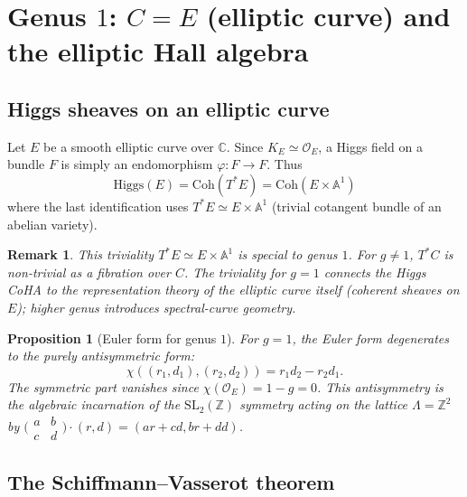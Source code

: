 \documentclass[11pt]{article}
\theoremstyle{garamondthm}
\newtheorem{proposition}[theorem]{Proposition}
\theoremstyle{garamonddef}
\theoremstyle{garamondrem}
\newtheorem{remark}[theorem]{Remark}
\newcommand{\Coh}{\mathrm{Coh}}
\newcommand{\cO}{\mathcal{O}}
\newcommand{\Higgs}{\mathrm{Higgs}}
\newcommand{\SL}{\mathrm{SL}}
\begin{document}

\section{Genus $1$: $C = E$ (elliptic curve) and the elliptic Hall algebra}
\label{sec:genus-1}

\subsection{Higgs sheaves on an elliptic curve}
\label{ssec:higgs-elliptic}

Let $E$ be a smooth elliptic curve over $\mathbb{C}$. Since $K_E \simeq \cO_E$, a Higgs field on a bundle $F$ is simply an endomorphism $\varphi \colon F \to F$. Thus
\[
 \Higgs(E) = \Coh(T^*E) = \Coh(E \times \mathbb{A}^1)
\]
where the last identification uses $T^*E \simeq E \times \mathbb{A}^1$ (trivial cotangent bundle of an abelian variety).

\begin{remark}
\label{rem:elliptic-trivial-cotangent}
This triviality $T^*E \simeq E \times \mathbb{A}^1$ is special to genus $1$. For $g \neq 1$, $T^*C$ is non-trivial as a fibration over $C$. The triviality for $g = 1$ connects the Higgs CoHA to the representation theory of the \emph{elliptic curve itself} (coherent sheaves on $E$); higher genus introduces spectral-curve geometry.
\end{remark}

\begin{proposition}[Euler form for genus $1$]
\label{prop:euler-form-g1}
For $g = 1$, the Euler form degenerates to the purely antisymmetric form:
\[
 \chi((r_1, d_1), (r_2, d_2)) = r_1 d_2 - r_2 d_1.
\]
The symmetric part vanishes since $\chi(\cO_E) = 1 - g = 0$. This antisymmetry is the algebraic incarnation of the $\SL_2(\mathbb{Z})$ symmetry acting on the lattice $\Lambda = \mathbb{Z}^2$ by $\bigl(\begin{smallmatrix} a & b \\ c & d \end{smallmatrix}\bigr) \cdot (r, d) = (ar + cd, br + dd)$.
\end{proposition}

\subsection{The Schiffmann--Vasserot theorem}
\label{ssec:sv-theorem}
\end{document}
